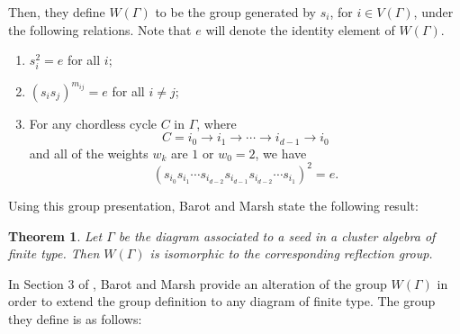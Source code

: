 \documentclass[11pt]{amsart}
\newtheorem{thm}{Theorem}[section]
\theoremstyle{definition}
\newcommand\V{V(\Gamma)}
\begin{document}
Then, they define $W(\Gamma)$ to be the group generated by $s_i$, for $i \in \V$, under the following relations. Note that $e$ will denote the identity element of $W(\Gamma)$. 
\begin{enumerate}
\item $s_i^2 = e$ for all $i$;
\item $(s_is_j)^{m_{ij}} = e$ for all $i \neq j$;
\item For any chordless cycle $C$ in $\Gamma$, where
\begin{displaymath}
C = i_0 \rightarrow i_1 \rightarrow \cdots \rightarrow i_{d-1} \rightarrow i_0
\end{displaymath}
and all of the weights $w_k$ are $1$ or $w_0 = 2$, we have
\begin{displaymath}
(s_{i_0}s_{i_1}\cdots s_{i_{d-2}}s_{i_{d-1}}s_{i_{d-2}}\cdots s_{i_1})^2 =e.
\end{displaymath}
\end{enumerate}

Using this group presentation, Barot and Marsh state the following result:
\begin{thm}\cite[Theorem A]{BM13}
Let $\Gamma$ be the diagram associated to a seed in a cluster algebra of finite type. Then $W(\Gamma)$ is isomorphic to the corresponding reflection group.
\end{thm}

In Section 3 of \cite{BM13}, Barot and Marsh provide an alteration of the group $W(\Gamma)$ in order to extend the group definition to any diagram of finite type. The group they define is as follows: 
\end{document}
